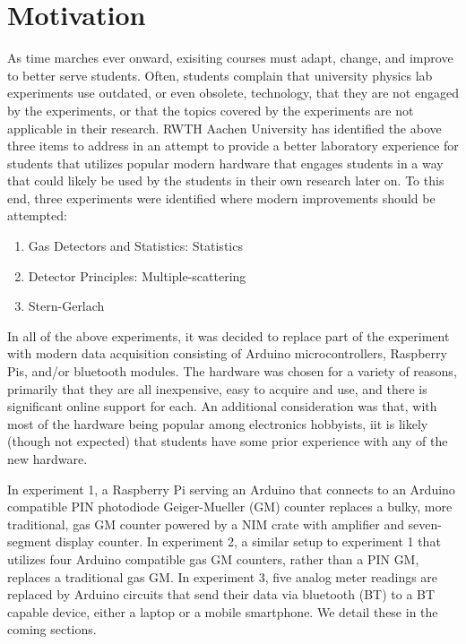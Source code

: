 \section{Motivation}
As time marches ever onward, exisiting courses must adapt, change, and improve to better serve students.
Often, students complain that university physics lab experiments use outdated, or even obsolete, technology, that they are not engaged by the experiments, or that the topics covered by the experiments are not applicable in their research.
RWTH Aachen University has identified the above three items to address in an attempt to provide a better laboratory experience for students that utilizes popular modern hardware that engages students in a way that could likely be used by the students in their own research later on.
To this end, three experiments were identified where modern improvements should be attempted:
\begin{enumerate}
\item Gas Detectors and Statistics: Statistics
\item Detector Principles: Multiple-scattering
\item Stern-Gerlach
  
\end{enumerate}

In all of the above experiments, it was decided to replace part of the experiment with modern data acquisition consisting of Arduino microcontrollers, Raspberry Pis, and/or bluetooth modules.
The hardware was chosen for a variety of reasons, primarily that they are all inexpensive, easy to acquire and use, and there is significant online support for each.
An additional consideration was that, with most of the hardware being popular among electronics hobbyists, iit is likely (though not expected) that students have some prior experience with any of the new hardware.


In experiment 1, a Raspberry Pi serving an Arduino that connects to an Arduino compatible PIN photodiode Geiger-Mueller (GM) counter replaces a bulky, more traditional, gas GM counter powered by a NIM crate with amplifier and seven-segment display counter.
In experiment 2, a similar setup to experiment 1 that utilizes four Arduino compatible gas GM counters, rather than a PIN GM, replaces a traditional gas GM.
In experiment 3, five analog meter readings are replaced by Arduino circuits that send their data via bluetooth (BT) to a BT capable device, either a laptop or a mobile smartphone.
We detail these in the coming sections.
